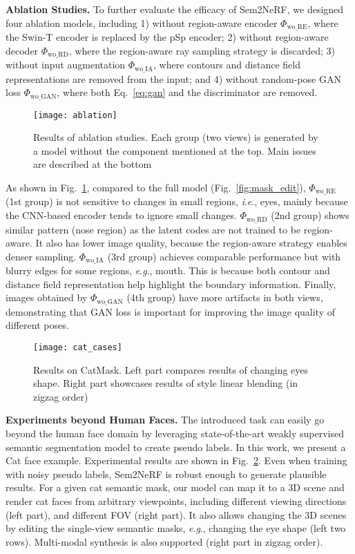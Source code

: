 \documentclass[runningheads]{llncs}
\newcommand{\ie}{\textit{i}.\textit{e}.}
\newcommand{\eg}{\textit{e}.\textit{g}.}
\begin{document}
\noindent\textbf{Ablation Studies.}  
To further evaluate the efficacy of Sem2NeRF, we designed four ablation models, including 1) without region-aware encoder $\Phi_{\text{wo\_RE}}$, where the Swin-T encoder is replaced by the pSp encoder; 2) without region-aware decoder $\Phi_{\text{wo\_RD}}$, where the region-aware ray sampling strategy is discarded; 3) without input augmentation $\Phi_{\text{wo\_IA}}$, where contours and distance field representations are removed from the input; and 4) without random-pose GAN loss $\Phi_{\text{wo\_GAN}}$, where both Eq.~\eqref{eq:gan} and the discriminator are removed.


\begin{figure}[t!]
    \centering
    \texttt{[image: ablation]}
    \caption{Results of ablation studies. Each group (two views) is generated by a model without the component mentioned at the top. Main issues are described at the bottom}
    \label{fig:ablation}
\end{figure}

As shown in Fig.~\ref{fig:ablation}, compared to the full model (Fig.~\ref{fig:mask_edit}), $\Phi_{\text{wo\_RE}}$ (1st group) is not sensitive to changes in small regions, \ie, eyes, mainly because the CNN-based encoder tends to ignore small changes. $\Phi_{\text{wo\_RD}}$ (2nd group) shows similar pattern (nose region) as the latent codes are not trained to be region-aware. It also has lower image quality, because the region-aware strategy enables denser sampling. $\Phi_{\text{wo\_IA}}$ (3rd group) achieves comparable performance but with blurry edges for some regions, \eg, mouth. This is because both contour and distance field representation help highlight the boundary information. Finally, images obtained by $\Phi_{\text{wo\_GAN}}$ (4th group) have more artifacts in both views, demonstrating that GAN loss is important for improving the image quality of different poses.  


\begin{figure}[t!]
    \centering
    \texttt{[image: cat\_cases]}
    \caption{Results on CatMask. Left part compares results of changing eyes shape. Right part showcases results of style linear blending (in zigzag order)}
    \label{fig:cat_cases}
\end{figure}



\noindent\textbf{Experiments beyond Human Faces.} The introduced task can easily go beyond the human face domain by leveraging state-of-the-art weakly supervised semantic segmentation model to create pseudo labels. In this work, we present a Cat face example.
Experimental results are shown in Fig.~\ref{fig:cat_cases}. 
Even when training with noisy pseudo labels, Sem2NeRF is robust enough to generate plausible results. For a given cat semantic mask, our model can map it to a 3D scene and render cat faces from arbitrary viewpoints, including different viewing directions (left part), and different FOV (right part). It also allows changing the 3D scenes by editing the single-view semantic masks, \eg, changing the eye shape (left two rows). Multi-modal synthesis is also supported (right part in zigzag order). 
\end{document}
